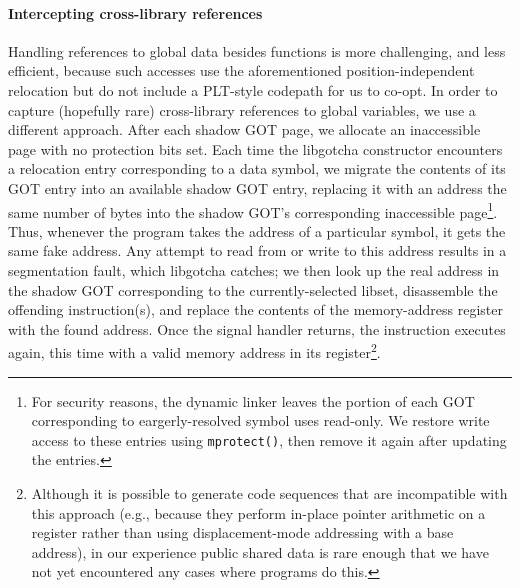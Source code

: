 \paragraph{Intercepting cross-library references}

Handling references to global data besides functions is more challenging, and less
efficient, because such accesses use the aforementioned position-independent
relocation but do not include a PLT-style codepath for us to co-opt.
In order to capture (hopefully rare) cross-library references to global variables,
we use a different approach.  After each shadow GOT page, we allocate an inaccessible
page with no protection bits set.  Each time the libgotcha constructor encounters a
relocation entry corresponding to a data symbol, we migrate the contents of its GOT
entry into an available shadow GOT entry, replacing it with an address the same
number of bytes into the shadow GOT's corresponding inaccessible page\footnote{For
security reasons, the dynamic linker leaves the portion of each GOT corresponding to
eargerly-resolved symbol uses read-only.  We restore write access to these entries
using \texttt{mprotect()}, then remove it again after updating the entries.}.  Thus,
whenever the program takes the address of a particular symbol, it gets the same fake
address.  Any attempt to read from or write to this address results in a segmentation
fault, which libgotcha catches; we then look up the real address in the shadow GOT
corresponding to the currently-selected libset, disassemble the offending
instruction(s), and replace the contents of the memory-address register with the
found address.  Once the signal handler returns, the instruction executes again, this
time with a valid memory address in its register\footnote{Although it is possible to
generate code sequences that are incompatible with this approach (e.g., because they
perform in-place pointer arithmetic on a register rather than using displacement-mode
addressing with a base address), in our experience public shared data is rare enough
that we have not yet encountered any cases where programs do this.}.




